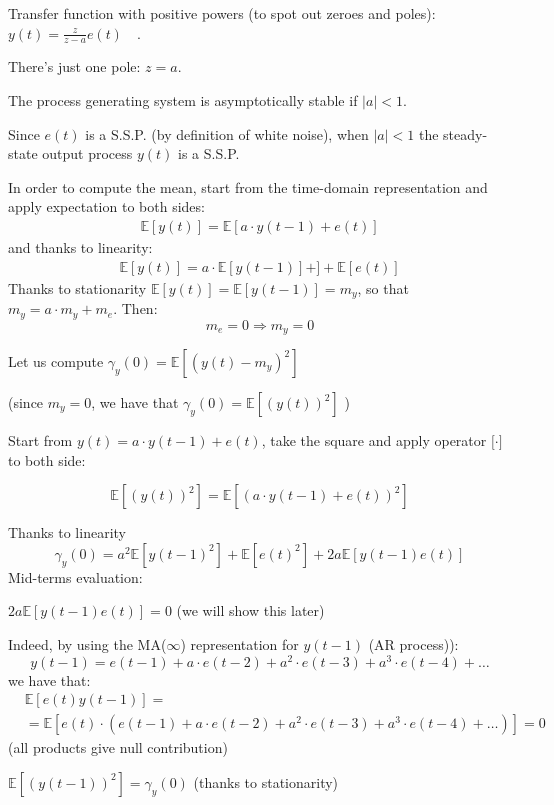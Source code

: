 Transfer function with positive powers (to spot out zeroes and poles): $y(t)=\frac{z}{z-a} e(t) \quad$.

There's just one pole: $z=a .$

The process generating system is asymptotically stable if $|a| <1$. 

Since $e(t)$ is a S.S.P. (by definition of white noise), when $|a| <1$ the steady-state output process $y(t)$ is a S.S.P.

In order to compute the mean, start from the time-domain representation and apply expectation to 
both sides:
\begin{align*}
	\mathbb{E}[y(t)]=\mathbb{E}[a \cdot y(t-1)+e(t)]
\end{align*}
and thanks to linearity:
\begin{align*}
	\mathbb{E}[y(t)]=a \cdot \mathbb{E}[y(t-1)]+]+\mathbb{E}[e(t)]
\end{align*}
Thanks to stationarity $\mathbb{E}[y(t)]=\mathbb{E}[y(t-1)]=m_{y}$, so that $m_{y}=a \cdot m_{y}+m_{e}$.
Then:
$$
m_{e}=0 \Rightarrow m_{y}=0
$$

Let us compute $\gamma_{y}(0)=\mathbb{E}\left[\left(y(t)-m_{y}\right)^{2}\right]$

(since $m_{y}=0$, we have that $\gamma_{y}(0)=\mathbb{E}\left[(y(t))^{2}\right]$ )

Start from $y(t)=a \cdot y(t-1)+e(t)$, take the square and apply operator $\mathbb[\cdot]$ to both side:

$$
\mathbb{E}\left[(y(t))^{2}\right]=\mathbb{E}\left[(a \cdot y(t-1)+e(t))^{2}\right]
$$

Thanks to linearity
$$
\gamma_{y}(0)=a^{2} \mathbb{E}\left[y(t-1)^{2}\right]+\mathbb{E}\left[e(t)^{2}\right]+2 a \mathbb{E}[y(t-1) e(t)]
$$
Mid-terms evaluation:

$2 a \mathbb{E}[y(t-1) e(t)]=0$ (we will show this later)

Indeed, by using the MA($\infty$) representation for $y(t-1)$ (AR process)):
$$
y(t-1)=e(t-1)+a \cdot e(t-2)+a^{2} \cdot e(t-3)+a^{3} \cdot e(t-4)+\ldots
$$
we have that:
\begin{align*}
	&\mathbb{E}[e(t) y(t-1)]= \\
	&=\mathbb{E}\left[e(t) \cdot\left(e(t-1)+a \cdot e(t-2)+a^{2} \cdot e(t-3)+a^{3} \cdot e(t-4)+\ldots\right)\right]=0
\end{align*}
(all products give null contribution)


$\mathbb{E}\left[(y(t-1))^{2}\right]=\gamma_{y}(0)$ (thanks to stationarity)

